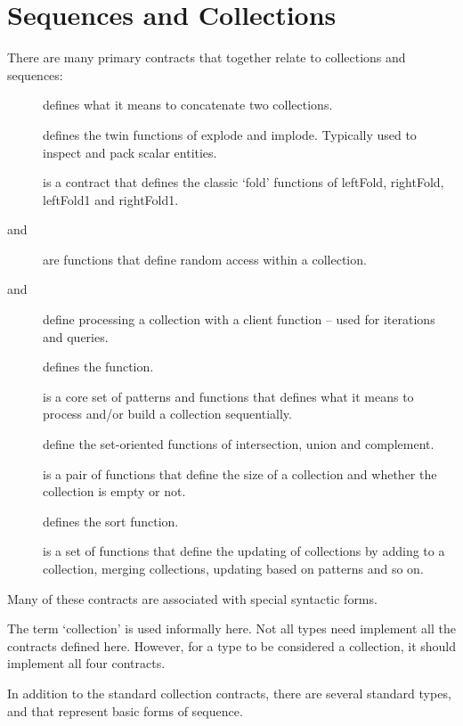 \chapter{Sequences and Collections}
\label{lists}
\label{listExpressions}
There are many primary contracts that together relate to collections and sequences:
\begin{description}
\item[] defines what it means to concatenate two collections.
\item[] defines the twin functions of explode and implode. Typically used to inspect and pack scalar entities.
\item[] is a contract that defines the classic `fold' functions of leftFold, rightFold, leftFold1 and rightFold1.
\item[ and ] are functions that define random access within a collection.
\item[ and ] define processing a collection with a client function -- used for iterations and queries.
\item[] defines the  function.
\item[] is a core set of patterns and functions that defines what it means to process and/or build a collection sequentially.
\item[] define the set-oriented functions of intersection, union and complement.
\item[] is a pair of functions that define the size of a collection and whether the collection is empty or not.
\item[] defines the sort function.
\item[] is a set of functions that define the updating of collections by adding to a collection, merging collections, updating based on patterns and so on.
\end{description}
Many of these contracts are associated with special syntactic forms.
\begin{aside}
The term `collection' is used informally here. Not all types need implement all the contracts defined here. However, for a type to be considered a collection, it should implement all four contracts.
\end{aside}

In addition to the standard collection contracts, there are several standard types,   and  that represent basic forms of sequence.



